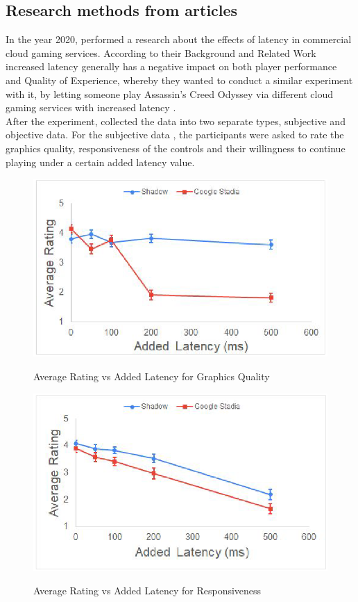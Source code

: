 \subsection{Research methods from articles}
In the year 2020, \citeauthor{desveaux2020effects} performed a research about the effects of latency in commercial cloud gaming services. According to their Background and Related Work \parencite[Section 2.3, Page 17]{desveaux2020effects} increased latency generally has a negative impact on both player performance and Quality of Experience, whereby they wanted to conduct a similar experiment with it, by letting someone play Assassin's Creed Odyssey via different cloud gaming services with increased latency \parencite[Section 3, Page 18]{desveaux2020effects}.\\
After the experiment, \citeauthor{desveaux2020effects} collected the data into two separate types, subjective and objective data. For the subjective data \parencite[Section 4.2.2, Page 36]{desveaux2020effects}, the participants were asked to rate the graphics quality, responsiveness of the controls and their willingness to continue playing under a certain added latency value.
\begin{figure}[H]
	\centering
	\includegraphics[width=12cm]{../img/fig13.png}
	\caption{Average Rating vs Added Latency for Graphics Quality}
	\parencite[Section 4.2.2, Page 36, Figure 13]{desveaux2020effects}
\end{figure}
\begin{figure}[H]
	\centering
	\includegraphics[width=12cm]{../img/fig14.png}
	\caption{Average Rating vs Added Latency for Responsiveness}
	\parencite[Section 4.2.2, Page 37, Figure 14]{desveaux2020effects}
\end{figure}
